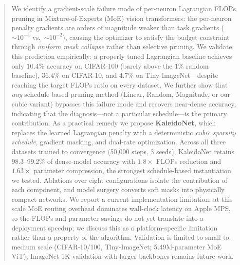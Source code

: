 \begin{abstract}
We identify a gradient-scale failure mode of per-neuron Lagrangian
FLOPs pruning in Mixture-of-Experts (MoE) vision transformers: the
per-neuron penalty gradients are orders of magnitude weaker than task
gradients (${\sim}10^{-4}$ vs.\ ${\sim}10^{-2}$), causing the
optimizer to satisfy the budget constraint through \emph{uniform mask
collapse} rather than selective pruning. We validate this prediction
empirically: a properly tuned Lagrangian baseline achieves only
$10.4\%$ accuracy on CIFAR-100 (barely above the $1\%$ random
baseline), $36.4\%$ on CIFAR-10, and $4.7\%$ on Tiny-ImageNet---despite
reaching the target FLOPs ratio on every dataset. We further show that
\emph{any} schedule-based pruning method (Linear, Random, Magnitude,
or our cubic variant) bypasses this failure mode and recovers
near-dense accuracy, indicating that the diagnosis---not a particular
schedule---is the primary contribution. As a practical remedy we
propose \textbf{KaleidoNet}, which replaces the learned Lagrangian
penalty with a deterministic \emph{cubic sparsity schedule}, gradient
masking, and dual-rate optimization. Across all three datasets trained
to convergence (50{,}000 steps, 3 seeds), KaleidoNet retains
98.3--99.2\% of dense-model accuracy with $1.8{\times}$ FLOPs
reduction and $1.63{\times}$ parameter compression, the strongest
schedule-based instantiation we tested. Ablations over eight
configurations isolate the contribution of each component, and model
surgery converts soft masks into physically compact networks. We
report a current implementation limitation: at this scale MoE routing
overhead dominates wall-clock latency on Apple MPS, so the FLOPs and
parameter savings do not yet translate into a deployment speedup; we
discuss this as a platform-specific limitation rather than a property
of the algorithm. Validation is limited to small-to-medium scale
(CIFAR-10/100, Tiny-ImageNet; 5.49M-parameter MoE ViT); ImageNet-1K
validation with larger backbones remains future work.
\end{abstract}
